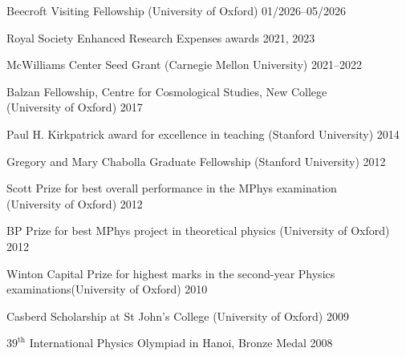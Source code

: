 \documentclass[11pt]{article}
\begin{document}
\vspace{0.45\baselineskip}

Beecroft Visiting Fellowship (University of Oxford) \hfill 01/2026--05/2026

\vspace{0.45\baselineskip}

Royal Society Enhanced Research Expenses awards \hfill 2021, 2023

\vspace{0.45\baselineskip}

McWilliams Center Seed Grant (Carnegie Mellon University) \hfill 2021--2022

\vspace{0.45\baselineskip}

Balzan Fellowship, Centre for Cosmological Studies, New College\\
(University of Oxford) \hfill 2017

\vspace{0.45\baselineskip}

Paul H. Kirkpatrick award for excellence in teaching (Stanford University) \hfill 2014

\vspace{0.45\baselineskip}

Gregory and Mary Chabolla Graduate Fellowship (Stanford University) \hfill 2012

\vspace{0.45\baselineskip}

Scott Prize for best overall performance in the MPhys examination\\
(University of Oxford) \hfill 2012 

\vspace{0.45\baselineskip}

BP Prize for best MPhys project in theoretical physics (University of Oxford) \hfill 2012

\vspace{0.45\baselineskip}

Winton Capital Prize for highest marks in the second-year Physics examinations\newline(University of Oxford) \hfill 2010

\vspace{0.45\baselineskip}

Casberd Scholarship at St John's College (University of Oxford) \hfill 2009

\vspace{0.45\baselineskip}

$39^\mathrm{th}$ International Physics Olympiad in Hanoi, Bronze Medal \hfill 2008
\end{document}
